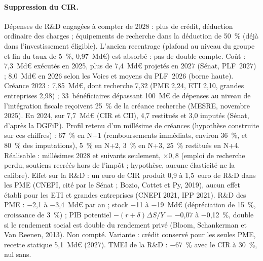 \paragraph{Suppression du CIR.} Dépenses de R\&D engagées à compter de 2028 : plus de crédit, déduction ordinaire des
charges ; équipements de recherche dans la déduction de 50~\% (déjà dans l'investissement éligible). L'ancien recentrage
(plafond au niveau du groupe et fin du taux de 5~\%, 0,97~Md€) est absorbé : pas de double compte. Coût : 7,3~Md€
exécutés en 2025, plus de 7,4~Md€ projetés en 2027 (Sénat, PLF~2027) ; 8,0~Md€ en 2026 selon les Voies et moyens du
PLF~2026 (borne haute). Créance 2023 : 7,85~Md€, dont recherche 7,32 (PME 2,24, ETI 2,10, grandes entreprises 2,98) ;
33~bénéficiaires dépassant 100~M€ de dépenses au niveau de l'intégration fiscale reçoivent 25~\% de la créance recherche
(MESRE, novembre 2025). En 2024, sur 7,7~Md€ (CIR et CII), 4,7 restitués et 3,0 imputés (Sénat, d'après la DGFiP). Profil
retenu d'un millésime de créances (hypothèse construite sur ces chiffres) : 67~\% en N+1 (remboursements immédiats,
environ 36~\%, et 80~\% des imputations), 5~\% en N+2, 3~\% en N+3, 25~\% restitués en N+4. Réalisable : millésimes 2028 et
suivants seulement, $\times 0{,}8$ (emploi de recherche perdu, soutiens recréés hors de l'impôt ; hypothèse, aucune
élasticité ne la calibre). Effet sur la R\&D : un euro de CIR produit 0,9 à 1,5~euro de R\&D dans les PME (CNEPI, cité
par le Sénat ; Bozio, Cottet et Py, 2019), aucun effet établi pour les ETI et grandes entreprises (CNEPI 2021, IPP 2021).
R\&D des PME : $-$2,1 à $-$3,4~Md€ par an ; stock $-$11 à $-$19~Md€ (dépréciation de 15~\%, croissance de 3~\%) ; PIB
potentiel $-(r+\delta)\Delta S/Y$ = $-$0,07 à $-$0,12~\%, double si le rendement social est double du rendement privé
(Bloom, Schankerman et Van Reenen, 2013). Non compté. Variante : crédit conservé pour les seules PME, recette statique
5,1~Md€ (2027). TMEI de la R\&D : $-$67~\% avec le CIR à 30~\%, nul sans.

